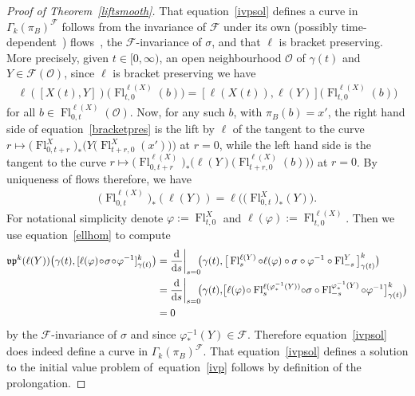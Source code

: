 \documentclass[pdftex]{sigma}
\numberwithin{equation}{section}
\def\Fl{\operatorname{Fl}}
\def\FF{{\mathcal{F}}}
\def\OO{{\mathcal{O}}}
\def\vpf{{\mathfrak{vp}}}
\begin{document}
\begin{proof}[Proof of Theorem~\ref{liftsmooth}]
That equation~\eqref{ivpsol} defines a curve in $\Gamma_{k}(\pi_{B})^{\FF}$ follows from the inva\-riance of $\FF$ under its own (possibly time-dependent~\cite[Lemma~3.3]{VilGar1}) flows~\cite[Proposition~1.6]{iakovos2}, the $\FF$-invariance of $\sigma$, and that $\ell$ is bracket preserving. More precisely, given $t\in[0,\infty)$, an open neighbourhood $\OO$ of $\gamma(t)$ and $Y\in\FF(\OO)$, since $\ell$ is bracket preserving we have
\begin{gather}\label{bracketpres}
\ell([X(t),Y])\big(\Fl^{\ell(X)}_{t,0}(b)\big) = [\ell(X(t)),\ell(Y)]\big(\Fl^{\ell(X)}_{t,0}(b)\big)
\end{gather}
for all $b\in\Fl^{\ell(X)}_{0,t}(\OO)$. Now, for any such $b$, with $\pi_{B}(b) = x'$, the right hand side of equation~\eqref{bracketpres} is the lift by $\ell$ of the tangent to the curve $r\mapsto\big(\Fl^{X}_{0,t+r}\big)_{*}\big(Y\big(\Fl_{t+r,0}^{X}(x')\big)\big)$ at $r = 0$,
while the left hand side is the tangent to the curve $r\mapsto \big(\Fl^{\ell(X)}_{0,t+r}\big)_{*}\big(\ell(Y)\big(\Fl^{\ell(X)}_{t+r,0}(b)\big)\big)$ at $r=0$. By uniqueness of flows therefore, we have
\begin{gather}\label{ellhom}
\big(\Fl^{\ell(X)}_{0,t}\big)_{*}(\ell(Y)) = \ell\big(\big(\Fl^{X}_{0,t}\big)_{*}(Y)\big).
\end{gather}
For notational simplicity denote $\varphi:=\Fl^{X}_{t,0}$ and $\ell(\varphi):=\Fl^{\ell(X)}_{t,0}$. Then we use equation~\eqref{ellhom} to compute
\begin{align*}
\vpf^{k}(\ell(Y))\big(\gamma(t),[\ell(\varphi)\!\circ\!\sigma\!\circ\!\varphi^{-1}]^{k}_{\gamma(t)}\big)
&= \frac{\rm d}{{\rm d}s}\bigg|_{s=0}\!\!\big(\gamma(t),\big[\Fl^{\ell(Y)}_{s}\circ\ell(\varphi) \circ\sigma\circ\varphi^{-1}\circ\Fl^{Y}_{-s}\big]^{k}_{\gamma(t)}\big)
\\
&= \frac{\rm d}{{\rm d}s}\bigg|_{s=0}\!\!\big(\gamma(t),\!\big[\ell(\varphi) \!\circ\Fl^{\ell(\varphi^{-1}_{*}(Y))}_{s}\! \circ\sigma\circ\Fl^{\varphi^{-1}_{*}(Y)}_{-s} \circ\varphi^{-1}\big]^{k}_{\gamma(t)}\big)
\\
&= 0
\end{align*}
by the $\FF$-invariance of $\sigma$ and since $\varphi^{-1}_{*}(Y)\in\FF$. Therefore equation~\eqref{ivpsol} does indeed define a curve in $\Gamma_{k}(\pi_{B})^{\FF}$. That equation~\eqref{ivpsol} defines a solution to the initial value problem of~equation~\eqref{ivp} follows by definition of the prolongation.


\end{proof}
\end{document}
